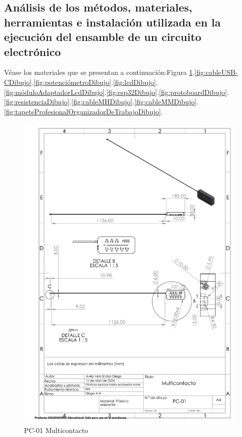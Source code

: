     \subsection{Análisis de los métodos, materiales, herramientas e instalación utilizada en la ejecución del ensamble de un circuito electrónico}
    
    Véase los materiales que se presentan a continuación:Figura \ref{fig:multicontactoDibujo}.\ref{fig:cableUSB-CDibujo}.\ref{fig:potenciómetroDibujo}.\ref{fig:lcdDibujo}.\ref{fig:móduloAdaptadorLcdDibujo}.\ref{fig:esp32Dibujo}.\ref{fig:protoboardDibujo}.\ref{fig:resistenciaDibujo}.\ref{fig:cableMHDibujo}.\ref{fig:cableMMDibujo}.\ref{fig:tapeteProfesionalOrganizadorDeTrabajoDibujo}. 
    \begin{figure}[H]
        \centering
        \includegraphics[scale=0.4]{3/Img/multicontactoDibujo.pdf}
        \caption{PC-01 Multicontacto} 
        \label{fig:multicontactoDibujo}
    \end{figure}
